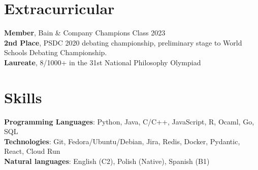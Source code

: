 \documentclass[letterpaper,11pt]{article}
\begin{document}
\section{Extracurricular}
\begin{itemize}[leftmargin=0.15in, label={}]
  \small{\item{
                \textbf{Member}{, Bain \& Company Champions Class 2023} \\
                \textbf{2nd Place}{, PSDC 2020 debating championship, preliminary stage to World Schools Debating Championship.} \\
                \textbf{Laureate}{, 8/1000+ in the 31st National Philosophy Olympiad} \\
          }}
\end{itemize}
\vspace{-16pt}

\section{Skills}
\begin{itemize}[leftmargin=0.15in, label={}]
  \small{\item{
                \textbf{Programming Languages}{: Python, Java, C/C++, JavaScript, R,  Ocaml, Go, SQL} \\
                \textbf{Technologies}{: Git, Fedora/Ubuntu/Debian, Jira, Redis, Docker, Pydantic, React, Cloud Run} \\
                \textbf{Natural languages}{: English (C2), Polish (Native), Spanish (B1) } \\
          }}
\end{itemize}
\vspace{-16pt}
\end{document}
